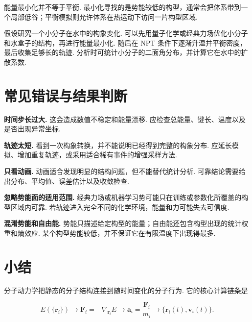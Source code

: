 \documentclass[UTF8,11pt,a4paper,openany]{ctexbook}
\begin{document}
能量最小化并不等于平衡. 最小化寻找的是势能较低的构型，通常会把体系带到一个局部低谷；平衡模拟则允许体系在热运动下访问一片构型区域. 

\begin{examplebox}
假设研究一个小分子在水中的构象变化. 可以先用量子化学或经典力场优化小分子和水盒子的结构，再进行能量最小化. 随后在 NPT 条件下逐渐升温并平衡密度，最后收集足够长的轨迹. 分析时可统计小分子的二面角分布，并计算它在水中的扩散系数. 
\end{examplebox}

\section{常见错误与结果判断}

\begin{limitbox}
\textbf{时间步长过大. } 这会造成数值不稳定和能量漂移. 应检查总能量、键长、温度以及是否出现异常坐标. 
\end{limitbox}

\begin{limitbox}
\textbf{轨迹太短. } 看到一次构象转换，并不能说明已经得到完整的构象分布. 应延长模拟、增加重复轨迹，或采用适合稀有事件的增强采样方法. 
\end{limitbox}

\begin{limitbox}
\textbf{只看动画. } 动画适合发现明显的结构问题，但不能替代统计分析. 可靠结论需要给出分布、平均值、误差估计以及收敛检查. 
\end{limitbox}

\begin{limitbox}
\textbf{忽略势能面的适用范围. } 经典力场或机器学习势可能只在训练或参数化所覆盖的构型区域内可靠. 若轨迹进入完全不同的化学环境，能量和力可能失去可信度. 
\end{limitbox}

\begin{limitbox}
\textbf{混淆势能和自由能. } 势能只描述给定构型的能量；自由能还包含构型出现的统计权重和熵效应. 某个构型势能较低，并不保证它在有限温度下出现得最多. 
\end{limitbox}

\section{小结}

分子动力学把静态的分子结构连接到随时间变化的分子行为. 它的核心计算链条是

\[
E(\{\mathbf r_i\})
\longrightarrow
\mathbf F_i=-\nabla_{\mathbf r_i}E
\longrightarrow
\mathbf a_i=\frac{\mathbf F_i}{m_i}
\longrightarrow
\{\mathbf r_i(t),\mathbf v_i(t)\}.
\]
\end{document}

